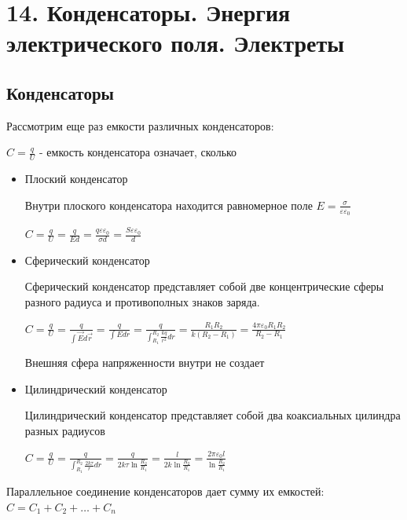 \documentclass[12pt]{article}
\begin{document}





\section{14. Конденсаторы. Энергия электрического поля. Электреты}

\subsection{Конденсаторы}

Рассмотрим еще раз емкости различных конденсаторов:

$C = \frac{q}{U}$ - емкость конденсатора означает, сколько 

\begin{itemize}
    \item Плоский конденсатор

    Внутри плоского конденсатора находится равномерное поле $E = \frac{\sigma}{\varepsilon\varepsilon_0}$

    $C = \frac{q}{U} = \frac{q}{Ed} = \frac{q \varepsilon \varepsilon_0}{\sigma d} = \frac{S \varepsilon \varepsilon_0}{d}$

    \item Сферический конденсатор

    Сферический конденсатор представляет собой две концентрические сферы разного радиуса и противополных знаков заряда.

    $C = \frac{q}{U} = \frac{q}{\int \vec{E}d\vec{r}} = \frac{q}{\int Edr} = \frac{q}{\int_{R_1}^{R_2} \frac{kq}{r^2} dr} = \frac{R_1 R_2}{k(R_2 - R_1)} = \frac{4\pi \varepsilon_0 R_1 R_2}{R_2 - R_1}$

    Внешняя сфера напряженности внутри не создает

    \item Цилиндрический конденсатор

    Цилиндрический конденсатор представляет собой два коаксиальных цилиндра разных радиусов

    $C = \frac{q}{U} = \frac{q}{\int_{R_1}^{R_2} \frac{2k\tau}{r} dr} = \frac{q}{2k\tau \ln\frac{R_2}{R_1}} = \frac{l}{2k\ln\frac{R_2}{R_1}} = \frac{2\pi \varepsilon_0 l}{\ln \frac{R_2}{R_1}}$

\end{itemize}

Параллельное соединение конденсаторов дает сумму их емкостей: $C = C_1 + C_2 + \dots + C_n$
\end{document}
